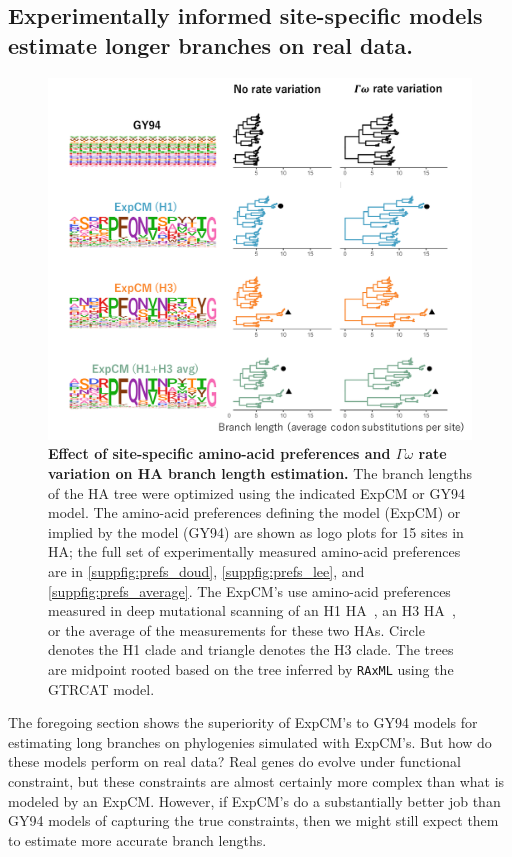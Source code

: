\documentclass[11pt]{article}
\begin{document}
\subsection*{Experimentally informed site-specific models estimate longer branches on real data.}

\begin{figure}
\centerline{\includegraphics[width=\textwidth]{figures/empirical_trees.pdf}}
\caption{\label{fig:empirical_trees}
\textbf{Effect of site-specific amino-acid preferences and $\Gamma\omega$ rate variation on HA branch length estimation.} 
The branch lengths of the HA tree were optimized using the indicated ExpCM or GY94 model. 
The amino-acid preferences defining the model (ExpCM) or implied by the model (GY94) are shown as logo plots for 15 sites in HA; the full set of experimentally measured amino-acid preferences are in \ref{suppfig:prefs_doud}, \ref{suppfig:prefs_lee}, and \ref{suppfig:prefs_average}. 
The ExpCM's use amino-acid preferences measured in deep mutational scanning of an H1 HA~\citep{doud2016accurate}, an H3 HA~\citep{lee2018deep}, or the average of the measurements for these two HAs.
Circle denotes the H1 clade and triangle denotes the H3 clade.
The trees are midpoint rooted based on the tree inferred by \texttt{RAxML} using the GTRCAT model. 
}
\end{figure}

The foregoing section shows the superiority of ExpCM's to GY94 models for estimating long branches on phylogenies simulated with ExpCM's.
But how do these models perform on real data?
Real genes do evolve under functional constraint, but these constraints are almost certainly more complex than what is modeled by an ExpCM.
However, if ExpCM's do a substantially better job than GY94 models of capturing the true constraints, then we might still expect them to estimate more accurate branch lengths.
\end{document}
